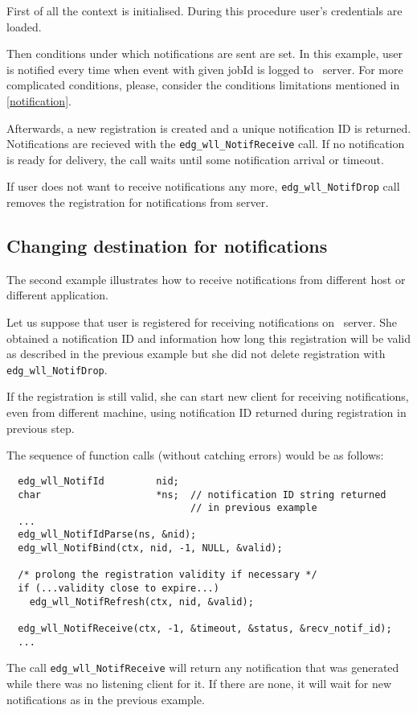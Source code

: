 First of all the context is initialised. During this procedure user's credentials are loaded. %

Then conditions under which notifications are sent are set. In this example, user is notified every time when event with given jobId is logged to \LB\ server. For more complicated conditions, please, consider the conditions limitations mentioned in \ref{notification}.

Afterwards, a new registration is created and a unique notification ID is
returned.
Notifications are recieved with the \verb'edg_wll_NotifReceive' call.
If no notification is ready for
delivery, the call waits until some notification arrival or timeout.

If user does not want to receive notifications any more, \verb'edg_wll_NotifDrop' call removes the registration for notifications from \LB server.


\subsection{Changing destination for notifications}

The second example illustrates how to receive notifications from different host or different application. 

Let us suppose that user is registered for receiving notifications on \LB\ server. She obtained a notification ID and information how long this registration will be valid as described in the previous example but she did not delete registration with \verb'edg_wll_NotifDrop'.

If the registration is still valid, she can start new client for receiving notifications, even from different machine, using notification ID returned during registration in previous step.

The sequence of function calls (without catching errors) would be as follows:

\begin{verbatim}
  edg_wll_NotifId         nid;
  char                    *ns;  // notification ID string returned 
                                // in previous example
  ...
  edg_wll_NotifIdParse(ns, &nid);
  edg_wll_NotifBind(ctx, nid, -1, NULL, &valid);

  /* prolong the registration validity if necessary */
  if (...validity close to expire...)
    edg_wll_NotifRefresh(ctx, nid, &valid);  

  edg_wll_NotifReceive(ctx, -1, &timeout, &status, &recv_notif_id);
  ...
\end{verbatim}

The call \verb'edg_wll_NotifReceive' will return any notification
that was generated while there was no listening client for it.
If there are none, it will wait for new notifications as in the previous
example.
